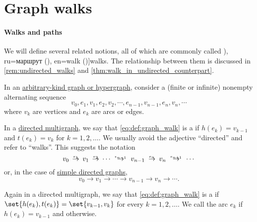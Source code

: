 \section{Graph walks}\label{sec:graph_walks}

\paragraph{Walks and paths}

\begin{definition}\label{def:graph_walk}\mimprovised
  We will define several related notions, all of which are commonly called \term[bg=маршрут (\cite[11]{Мирчев2001Графи}), ru=маршрут (\cite[23]{ЕмеличевИПр1990ТеорияГрафов}), en=walk (\cite[10]{Diestel2017GraphTheory})]{walks}. The relationship between them is discussed in \cref{rem:undirected_walks} and \cref{thm:walk_in_undirected_counterpart}.

  In an \hyperref[rem:arbitrary_kind_graph]{arbitrary-kind graph or hypergraph}, consider a (finite or infinite) nonempty alternating sequence
  \begin{equation}\label{eq:def:graph_walk}
    v_0, e_1, v_1, e_2, v_2, \cdots, e_{n-1}, v_{n-1}, e_n, v_n, \cdots
  \end{equation}
  where \( v_k \) are vertices and \( e_k \) are arcs or edges.

  \begin{thmenum}[series=def:graph_walk]
     In a \hyperref[def:directed_multigraph]{directed multigraph}, we say that \eqref{eq:def:graph_walk} is a  if \( h(e_k) = v_{k-1} \) and \( t(e_k) = v_k \) for \( k = 1, 2, \ldots \). We usually avoid the adjective \enquote{directed} and refer to \enquote{walks}. This suggests the notation
    \begin{equation}\label{eq:def:graph_walk/directed}
      v_0 \reloset {e_1} \to v_1 \reloset {e_2} \to \cdots \reloset {e_{n-1}} \to v_{n-1} \reloset {e_n} \to v_n \reloset {e_{n+1}} \to \cdots
    \end{equation}
    or, in the case of \hyperref[def:directed_graph]{simple directed graphs},
    \begin{equation*}
      v_0 \to v_1 \to \cdots \to v_{n-1} \to v_n \to \cdots.
    \end{equation*}

     Again in a directed multigraph, we say that \eqref{eq:def:graph_walk} is a  if \( \set{ h(e_k), t(e_k) } = \set{ v_{k-1}, v_k } \) for every \( k = 1, 2, \ldots \). We call the arc \( e_k \)  if \( h(e_k) = v_{k-1} \) and  otherwise.


\end{thmenum}
\end{definition}
